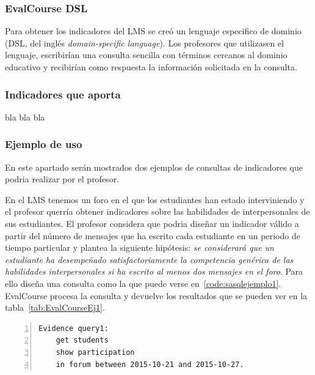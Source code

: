 \subsubsection{EvalCourse DSL}

Para obtener los indicadores del LMS se creó un lenguaje especifico de dominio (DSL, del inglés \emph{domain-specific language}). Los profesores que utilizasen el lenguaje, escribirían una consulta sencilla con términos cercanos al dominio educativo y recibirían como respuesta la información solicitada en la consulta. 

\subsubsection{Indicadores que aporta}

bla bla bla

\subsubsection{Ejemplo de uso}

En este apartado serán mostrados dos ejemplos de consultas de indicadores que podria realizar por el profesor.

En el LMS tenemos un foro en el que los estudiantes han estado interviniendo y el profesor querría obtener indicadores sobre las habilidades de interpersonales de sus estudiantes. El profesor considera que podria diseñar un indicador válido a partir del número de mensajes que ha escrito cada estudiante en un periodo de tiempo particular y plantea la siguiente hipótesis: \emph{se considerará que un estudiante ha desempeñado satisfactoriamente la competencia genérica de las habilidades interpersonales si ha escrito al menos dos mensajes en el foro}. Para ello diseña una consulta como la que puede verse en~\ref{code:sasqlejemplo1}. EvalCourse procesa la consulta y devuelve los resultados que se pueden ver en la tabla~\ref{tab:EvalCourseEj1}.

\begin{lstlisting}[caption=Participación en el foro en un periodo concreto de tiempo ,label=code:sasqlejemplo1,numbers=left, captionpos=b, morekeywords={Evidence,get, students, show, milestones, participation, access, in, assignment, forum, campus, workshop, interaction, between, and}]
Evidence query1: 
	get students
	show participation
	in forum between 2015-10-21 and 2015-10-27.
\end{lstlisting}

